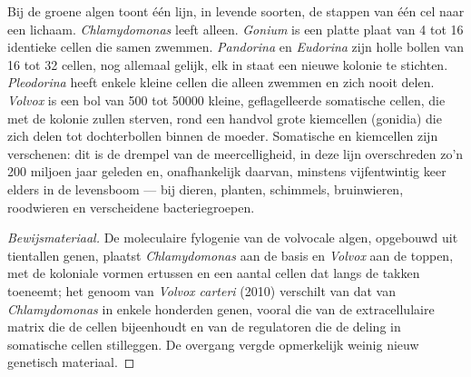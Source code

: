 \begin{proposition}\label{prop:b2:unicellular-diversity:volvox}
Bij de groene algen toont één lijn, in levende soorten, de stappen van
één cel naar een lichaam. \emph{Chlamydomonas} leeft alleen.
\emph{Gonium} is een platte plaat van 4 tot 16 identieke cellen die samen
zwemmen. \emph{Pandorina} en \emph{Eudorina} zijn holle bollen van 16
tot 32 cellen, nog allemaal gelijk, elk in staat een nieuwe kolonie te
stichten. \emph{Pleodorina} heeft enkele kleine cellen die alleen
zwemmen en zich nooit delen. \emph{Volvox} is een bol van \num{500} tot
\num{50000} kleine, geflagelleerde somatische cellen, die met de kolonie
zullen sterven, rond een handvol grote kiemcellen (gonidia) die zich
delen tot dochterbollen binnen de moeder. Somatische en kiemcellen zijn
verschenen: dit is de drempel van de meercelligheid, in deze lijn
overschreden zo'n \num{200} miljoen jaar geleden en, onafhankelijk
daarvan, minstens vijfentwintig keer elders in de levensboom --- bij
dieren, planten, schimmels, bruinwieren, roodwieren en verscheidene
bacteriegroepen.
\end{proposition}
\begin{proof}[Bewijsmateriaal]
De moleculaire fylogenie van de volvocale algen, opgebouwd uit tientallen
genen, plaatst \emph{Chlamydomonas} aan de basis en \emph{Volvox}
aan de toppen, met de koloniale vormen ertussen en een aantal cellen
dat langs de takken toeneemt; het genoom van \emph{Volvox carteri}
(2010) verschilt van dat van \emph{Chlamydomonas} in enkele honderden
genen, vooral die van de extracellulaire matrix die de cellen bijeenhoudt
en van de regulatoren die de deling in somatische cellen stilleggen. De
overgang vergde opmerkelijk weinig nieuw genetisch materiaal.
\end{proof}

